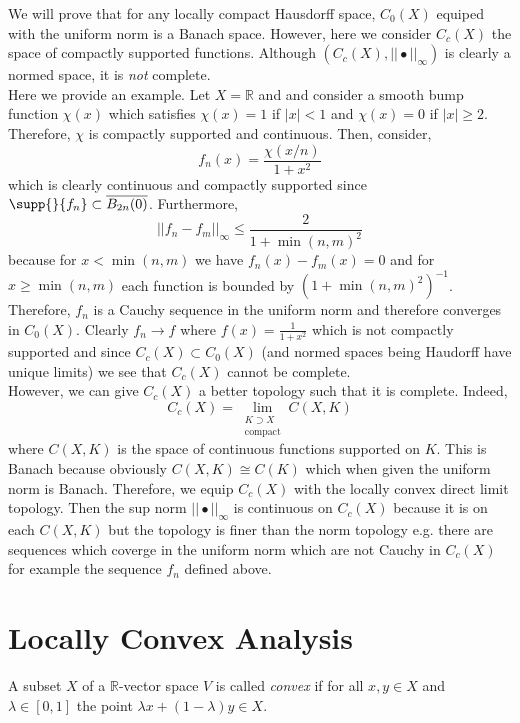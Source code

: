\documentclass[12pt]{article}
\newcommand{\R}{\mathbb{R}}
\begin{document}
\begin{example}
We will prove that for any locally compact Hausdorff space, $C_0(X)$ equiped with the uniform norm is a Banach space. However, here we consider $C_c(X)$ the space of compactly supported functions. Although $(C_c(X), || \bullet ||_\infty)$ is clearly a normed space, it is \textit{not} complete.
\bigskip\\
Here we provide an example. Let $X = \R$ and and consider a smooth bump function $\chi(x)$ which satisfies $\chi(x) = 1$ if $|x| < 1$ and $\chi(x) = 0$ if $|x| \ge 2$. Therefore, $\chi$ is compactly supported and continuous. Then, consider,
\[ f_n(x) = \frac{\chi(x/n)}{1 + x^2} \]
which is clearly continuous and compactly supported since $\supp{}{f_n} \subset \overline{B_{2n}(0)}$. Furthermore,
\[ || f_n - f_m ||_{\infty} \le \frac{2}{1 + \min{(n, m)}^2} \]
because for $x < \min{(n,m)}$ we have $f_n(x) - f_m(x) = 0$ and for $x \ge \min{(n,m)}$ each function is bounded by $(1 + \min{(n, m)}^2)^{-1}$. Therefore, $f_n$ is a Cauchy sequence in the uniform norm and therefore converges in $C_0(X)$. Clearly $f_n \to f$ where $f(x) = \frac{1}{1 + x^2}$ which is not compactly supported and since $C_c(X) \subset C_0(X)$ (and normed spaces being Haudorff have unique limits) we see that $C_c(X)$ cannot be complete.
\bigskip\\
However, we can give $C_c(X)$ a better topology such that it is complete. Indeed,
\[ C_c(X) = \lim_{\substack{K \supset X \\ \text{compact}}} C(X, K) \]
where $C(X, K)$ is the space of continuous functions supported on $K$. This is Banach because obviously $C(X,K) \cong C(K)$ which when given the uniform norm is Banach. Therefore, we equip $C_c(X)$ with the locally convex direct limit topology. Then the sup norm $|| \bullet ||_\infty$ is continuous on $C_c(X)$ because it is on each $C(X, K)$ but the topology is finer than the norm topology e.g. there are sequences which coverge in the uniform norm which are not Cauchy in $C_c(X)$ for example the sequence $f_n$ defined above. 
\end{example}


\section{Locally Convex Analysis}

\begin{defn}
A subset $X$ of a $\R$-vector space $V$ is called \textit{convex} if for all $x, y \in X$ and $\lambda \in [0,1]$ the point $\lambda x + (1 - \lambda) y \in X$.
\end{defn}
\end{document}

